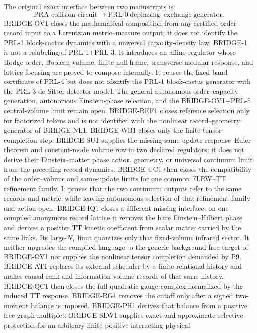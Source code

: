 The original exact interface between two manuscripts is
\[
 \text{PRA collision circuit}
 \longrightarrow
 \text{PRL-0 dephasing--exchange generator}.
\]
BRIDGE-OV1 closes the mathematical composition from any certified
order--record input to a Lorentzian metric--measure output; it does not
identify the PRL-1 block-cactus dynamics with a universal capacity-density
law.  BRIDGE-1 is not a relabeling of PRL-1+PRL-3.  It introduces an affine
regulator whose Hodge order, Boolean volume, finite null frame, transverse
modular response, and lattice focusing are proved to compose internally.  It
reuses the fixed-band certificate of PRL-4 but does not identify the PRL-1
block-cactus generator with the PRL-3 de Sitter detector model.  The general
autonomous order--capacity generation, autonomous Einstein-phase selection,
and the BRIDGE-OV1+PRL-5 central-volume limit remain open.  BRIDGE-REF1 closes
reference selection only for factorized tokens and is not identified with
the nonlinear record--geometry generator of BRIDGE-NL1.  BRIDGE-WB1 closes
only the finite tensor-completion step.  BRIDGE-SU1 supplies the missing
same-update response--Euler theorem and constant-mode volume row in two
declared regulators; it does not derive their Einstein--matter phase action,
geometry, or universal continuum limit from the preceding record dynamics.
BRIDGE-UC1 then closes the compatibility of the order--volume and
same-update limits for one common FLRW--TT refinement family.  It proves that
the two continuum outputs refer to the same records and metric, while leaving
autonomous selection of that refinement family and action open.
BRIDGE-IQ1 closes a different missing interface: on one compiled anonymous
record lattice it removes the bare Einstein--Hilbert phase and derives a
positive TT kinetic coefficient from scalar matter carried by the same
links.  Its large-\(N_s\) limit quantizes only that fixed-volume infrared
sector.  It neither upgrades the compiled language to the generic
background-free target of BRIDGE-OV1 nor supplies the nonlinear tensor
completion demanded by P9.
BRIDGE-AT1 replaces its external scheduler by a finite relational history
and makes causal rank and information volume records of that same history.
BRIDGE-QC1 then closes the full quadratic gauge complex normalized by the
induced TT response.  BRIDGE-RG1 removes the cutoff only after a signed
two-moment balance is imposed.  BRIDGE-PH1 derives that balance from a
positive free graph multiplet.  BRIDGE-SLW1 supplies exact and approximate
selective protection for an arbitrary finite positive interacting physical
